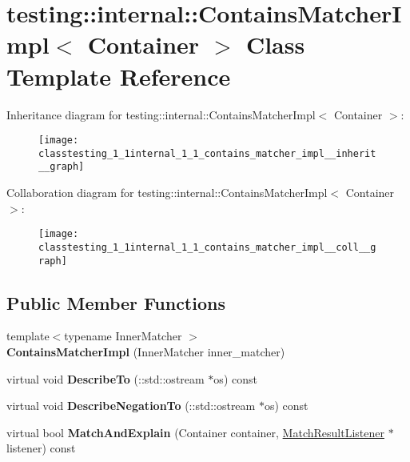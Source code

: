 \hypertarget{classtesting_1_1internal_1_1_contains_matcher_impl}{}\section{testing\+:\+:internal\+:\+:Contains\+Matcher\+Impl$<$ Container $>$ Class Template Reference}
\label{classtesting_1_1internal_1_1_contains_matcher_impl}


Inheritance diagram for testing\+:\+:internal\+:\+:Contains\+Matcher\+Impl$<$ Container $>$\+:
\nopagebreak
\begin{figure}[H]
\begin{center}
\leavevmode
\texttt{[image: classtesting\_1\_1internal\_1\_1\_contains\_matcher\_impl\_\_inherit\_\_graph]}
\end{center}
\end{figure}


Collaboration diagram for testing\+:\+:internal\+:\+:Contains\+Matcher\+Impl$<$ Container $>$\+:
\nopagebreak
\begin{figure}[H]
\begin{center}
\leavevmode
\texttt{[image: classtesting\_1\_1internal\_1\_1\_contains\_matcher\_impl\_\_coll\_\_graph]}
\end{center}
\end{figure}
\subsection*{Public Member Functions}
\begin{DoxyCompactItemize}
\item 
\mbox{\label{classtesting_1_1internal_1_1_contains_matcher_impl_a3fd56f21081068101a76ebe05fc1d7f4}} 
{\footnotesize template$<$typename Inner\+Matcher $>$ }\\{\bfseries Contains\+Matcher\+Impl} (Inner\+Matcher inner\+\_\+matcher)
\item 
\mbox{\label{classtesting_1_1internal_1_1_contains_matcher_impl_af47e4e9f890d64e7f8abcdf3f5fb8b3e}} 
virtual void {\bfseries Describe\+To} (\+::std\+::ostream $\ast$os) const
\item 
\mbox{\label{classtesting_1_1internal_1_1_contains_matcher_impl_a9d7867110ba3f346399f23e41cc75c5b}} 
virtual void {\bfseries Describe\+Negation\+To} (\+::std\+::ostream $\ast$os) const
\item 
\mbox{\label{classtesting_1_1internal_1_1_contains_matcher_impl_a1cb9f1d2da48bd4a48c281215f8f94e9}} 
virtual bool {\bfseries Match\+And\+Explain} (Container container, \hyperlink{classtesting_1_1_match_result_listener}{Match\+Result\+Listener} $\ast$listener) const
\end{DoxyCompactItemize}
